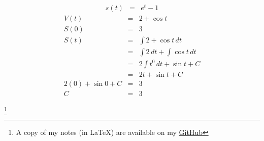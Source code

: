 \documentclass{article}
\newcommand\blfootnote[1]{
    \begingroup
    \renewcommand\thefootnote{}\footnote{#1}
    \addtocounter{footnote}{-1}
    \endgroup
}
\begin{document}
\begin{enumerate}
\begin{eqnarray}
            s(t) &=& e^t - 1
        \end{eqnarray}
        \begin{eqnarray}
            V(t) &=& 2 + \cos{t} \\
            S(0) &=& 3 \\
            S(t) &=& \int{2 + \cos{t}}\,dt \\
                 &=& \int{2}\,dt + \int{\cos{t}}\,dt \\
                 &=& 2\int{t^0}\,dt + \sin{t} + C \\
                 &=& 2t + \sin{t} + C \\
            2(0) + \sin{0} + C &=& 3 \\
            C &=& 3
        \end{eqnarray}
\end{enumerate}

\blfootnote{A copy of my notes (in \LaTeX) are available on my \href{https://github.com/onlinechronically/MATH-211}{GitHub}}
\end{document}
